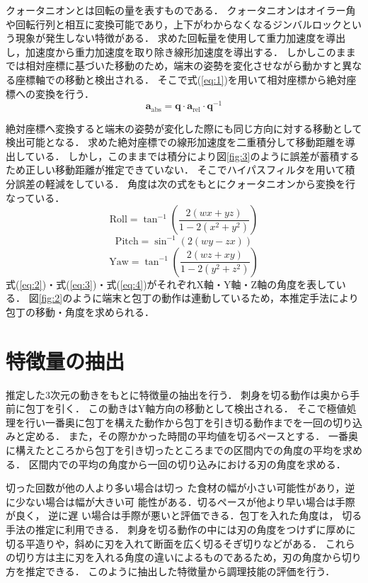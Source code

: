 クォータニオンとは回転の量を表すものである．
クォータニオンはオイラー角や回転行列と相互に変換可能であり，上下がわからなくなるジンバルロックという現象が発生しない特徴がある．
求めた回転量を使用して重力加速度を導出し，加速度から重力加速度を取り除き線形加速度を導出する．
しかしこのままでは相対座標に基づいた移動のため，端末の姿勢を変化させながら動かすと異なる座標軸での移動と検出される．
そこで式(\ref{eq:1})を用いて相対座標から絶対座標への変換を行う．
\begin{equation}
	\mathbf{a}_{\text{abs}} = \mathbf{q} \cdot \mathbf{a}_{\text{rel}} \cdot \mathbf{q}^{-1}
	\label{eq:1}
\end{equation}
	
絶対座標へ変換すると端末の姿勢が変化した際にも同じ方向に対する移動として検出可能となる．
求めた絶対座標での線形加速度を二重積分して移動距離を導出している．
しかし，このままでは積分により図\ref{fig:3}のように誤差が蓄積するため正しい移動距離が推定できていない．
そこでハイパスフィルタを用いて積分誤差の軽減をしている．
角度は次の式をもとにクォータニオンから変換を行なっている．
\begin{equation}
	\text{Roll} = \tan^{-1}\left( \frac{2(w x + y z)}{1 - 2(x^2 + y^2)} \right)
	\label{eq:2}
\end{equation}
\begin{equation}
	\text{Pitch} = \sin^{-1}\left( 2(w y - z x) \right)
	\label{eq:3}
\end{equation}
\begin{equation}
	\text{Yaw} = \tan^{-1}\left( \frac{2(w z + x y)}{1 - 2(y^2 + z^2)} \right)
	\label{eq:4}
\end{equation}
式(\ref{eq:2})・式(\ref{eq:3})・式(\ref{eq:4})がそれぞれX軸・Y軸・Z軸の角度を表している．
図\ref{fig:2}のように端末と包丁の動作は連動しているため，本推定手法により包丁の移動・角度を求められる．

\section{特徴量の抽出}
推定した3次元の動きをもとに特徴量の抽出を行う．
刺身を切る動作は奥から手前に包丁を引く．
この動きはY軸方向の移動として検出される．
そこで極値処理を行い一番奥に包丁を構えた動作から包丁を引き切る動作までを一回の切り込みと定める．
また，その際かかった時間の平均値を切るペースとする．
一番奥に構えたところから包丁を引き切ったところまでの区間内での角度の平均を求める．
区間内での平均の角度から一回の切り込みにおける刃の角度を求める．

切った回数が他の人より多い場合は切っ
た食材の幅が小さい可能性があり，逆に少ない場合は幅が大きい可
能性がある．切るペースが他より早い場合は手際が良く， 逆に遅
い場合は手際が悪いと評価できる．包丁を入れた角度は， 切る手法の推定に利用できる．
刺身を切る動作の中には刃の角度をつけずに厚めに切る平造りや，斜めに刃を入れて断面を広く切るそぎ切りなどがある．
これらの切り方は主に刃を入れる角度の違いによるものであるため，刃の角度から切り方を推定できる．
このように抽出した特徴量から調理技能の評価を行う．